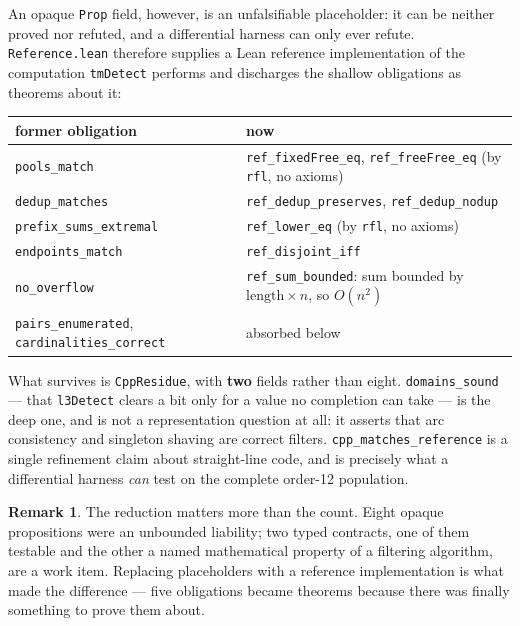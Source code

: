 \documentclass[11pt,a4paper,oneside]{report}
\theoremstyle{definition}
\newtheorem{remark}[theorem]{Remark}
\begin{document}
\noindent An opaque \texttt{Prop} field, however, is an unfalsifiable
placeholder: it can be neither proved nor refuted, and a differential harness can
only ever refute. \texttt{Reference.lean} therefore supplies a Lean reference
implementation of the computation \texttt{tmDetect} performs and discharges the
shallow obligations as theorems about it:

\begin{center}\footnotesize
\begin{tabular}{@{}ll@{}}
\toprule
former obligation & now \\
\midrule
\texttt{pools\_match} & \texttt{ref\_fixedFree\_eq}, \texttt{ref\_freeFree\_eq} (by \texttt{rfl}, no axioms) \\
\texttt{dedup\_matches} & \texttt{ref\_dedup\_preserves}, \texttt{ref\_dedup\_nodup} \\
\texttt{prefix\_sums\_extremal} & \texttt{ref\_lower\_eq} (by \texttt{rfl}, no axioms) \\
\texttt{endpoints\_match} & \texttt{ref\_disjoint\_iff} \\
\texttt{no\_overflow} & \texttt{ref\_sum\_bounded}: sum bounded by $\text{length}\times n$, so $O(n^2)$ \\
\texttt{pairs\_enumerated}, \texttt{cardinalities\_correct} & absorbed below \\
\bottomrule
\end{tabular}
\end{center}

\noindent What survives is \texttt{CppResidue}, with \textbf{two} fields rather
than eight. \texttt{domains\_sound} --- that \texttt{l3Detect} clears a bit only
for a value no completion can take --- is the deep one, and is not a
representation question at all: it asserts that arc consistency and singleton
shaving are correct filters. \texttt{cpp\_matches\_reference} is a single
refinement claim about straight-line code, and is precisely what a differential
harness \emph{can} test on the complete order-12 population.

\begin{remark}
The reduction matters more than the count. Eight opaque propositions were an
unbounded liability; two typed contracts, one of them testable and the other a
named mathematical property of a filtering algorithm, are a work item. Replacing
placeholders with a reference implementation is what made the difference ---
five obligations became theorems because there was finally something to prove
them about.
\end{remark}
\end{document}
